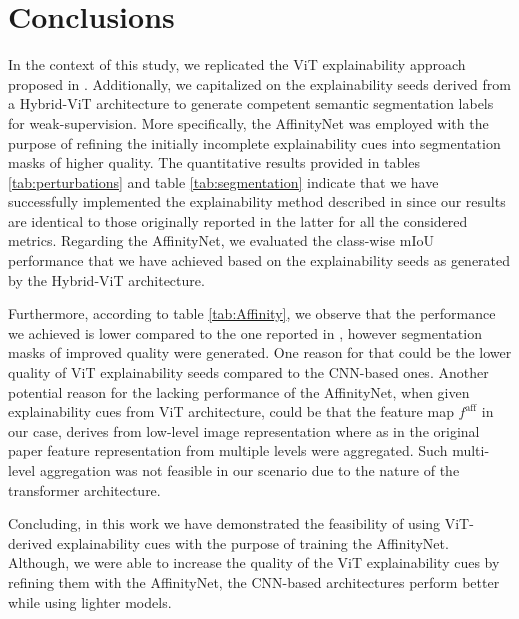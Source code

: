 \section{Conclusions}
In the context of this study, we replicated the ViT explainability approach proposed in \cite{mainpaper}. Additionally, we capitalized on the explainability seeds derived from a Hybrid-ViT architecture to generate competent semantic segmentation labels for weak-supervision. More specifically, the AffinityNet \cite{ahn2018learning} was employed with the purpose of refining the initially incomplete explainability cues into segmentation masks of higher quality. The quantitative results provided in tables \ref{tab:perturbations} and table \ref{tab:segmentation} indicate that we have successfully implemented the explainability method described in \cite{mainpaper} since our results are identical to those originally reported in the latter for all the considered metrics. Regarding the AffinityNet, we evaluated the class-wise mIoU performance that we have achieved based on the explainability seeds as generated by the Hybrid-ViT architecture. 

Furthermore, according to table \ref{tab:Affinity}, we observe that the performance we achieved is lower compared to the one reported in \cite{ahn2018learning}, however segmentation masks of improved quality were generated. One reason for that could be the lower quality of ViT explainability seeds compared to the CNN-based ones. Another potential reason for the lacking performance of the AffinityNet, when given explainability cues from ViT architecture, could be that the feature map $f^\text{aff}$ in our case, derives from low-level image representation where as in the original paper \cite{ahn2018learning} feature representation from multiple levels were aggregated. Such multi-level aggregation was not feasible in our scenario due to the nature of the transformer architecture. 

Concluding, in this work we have demonstrated the feasibility of using ViT-derived explainability cues with the purpose of training the AffinityNet. Although, we were able to increase the quality of the ViT explainability cues by refining them with the AffinityNet, the CNN-based architectures perform better while using lighter models.

